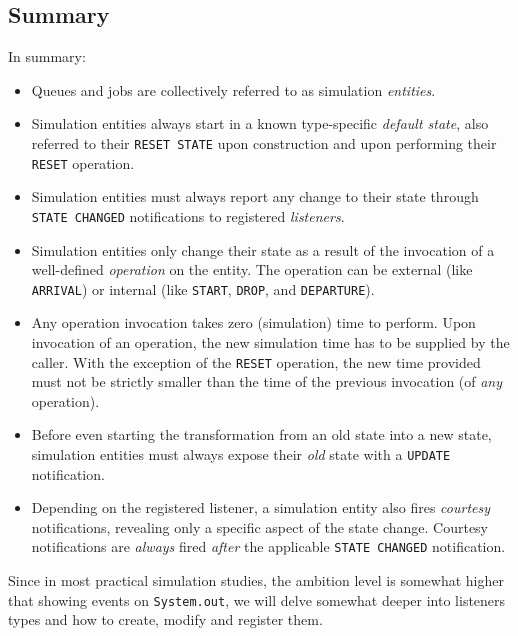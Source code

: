 \documentclass[12pt]{book}
\begin{document}
\subsection{Summary}

In summary:
\begin{itemize}
  \item Queues and jobs are collectively referred to as simulation {\em entities}.
  \item Simulation entities always start in a known type-specific {\em default state},
          also referred to their \lstinline|RESET STATE| upon construction
          and upon performing their \lstinline|RESET| operation.
  \item Simulation entities must always report any change to their state through
	  \lstinline|STATE CHANGED| notifications to registered {\em listeners}.
  \item Simulation entities only change their state
          as a result of the invocation of a well-defined
          {\em operation\/} on the entity.
        The operation can be external (like \lstinline-ARRIVAL-)
          or internal (like \lstinline-START-, \lstinline-DROP-, and \lstinline-DEPARTURE-).
  \item Any operation invocation takes zero (simulation) time to perform.
        Upon invocation of an operation, the new simulation time has to be supplied
          by the caller.
        With the exception of the \lstinline|RESET| operation,
          the new time provided must not be strictly smaller than the
          time of the previous invocation (of {\em any\/} operation).
  \item Before even starting the transformation from an old state into a new state,
	  simulation entities must always expose their {\em old\/} state
	  with a \lstinline|UPDATE| notification.
  \item Depending on the registered listener,
	  a simulation entity also fires {\em courtesy\/} notifications,
          revealing only a specific aspect of the state change.
        Courtesy notifications are {\em always\/} fired {\em after\/}
          the applicable \lstinline|STATE CHANGED| notification.
\end{itemize}

Since in most practical simulation studies,
  the ambition level is somewhat higher that showing events on \lstinline|System.out|,
  we will delve somewhat deeper into listeners types and how
  to create, modify and register them.
\end{document}
